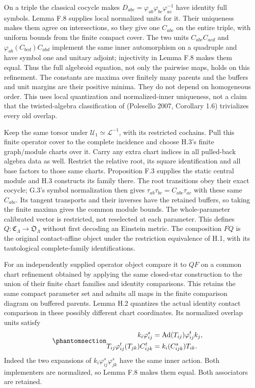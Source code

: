 \documentclass[
  english,
  11pt,
  reqno]{amsart}
\begin{document}
On a triple the classical cocycle makes
\(D_{abc}=\varphi_{ab}\varphi_{bc}\varphi_{ac}^{-1}\) have identity full
symbols. Lemma F.8 supplies local normalized units for it. Their
uniqueness makes them agree on intersections, so they give one
\(C_{abc}\) on the entire triple, with uniform bounds from the finite
compact cover. The two units \(C_{abc}C_{acd}\) and
\(\varphi_{ab}(C_{bcd})C_{abd}\) implement the same inner automorphism
on a quadruple and have symbol one and unitary adjoint; injectivity in
Lemma F.8 makes them equal. Thus the full algebroid equation, not only
the pairwise maps, holds on this refinement. The constants are maxima
over finitely many parents and the buffers and unit margins are their
positive minima. They do not depend on homogeneous order. This uses
local quantization and normalized-inner uniqueness, not a claim that the
twisted-algebra classification of (Polesello 2007, Corollary 1.6)
trivializes every old overlap.

Keep the same torsor under \(\mathscr U_1\simeq\mathcal L^{-1}\), with
its restricted cochains. Pull this finite operator cover to the complete
incidence and choose H.3's finite graph/module charts over it. Carry any
extra chart indices in all pulled-back algebra data as well. Restrict
the relative root, its square identification and all base factors to
those same charts. Proposition F.3 supplies the static central module
and H.3 constructs its family there. The root transitions obey their
exact cocycle; G.3's symbol normalization then gives
\(\tau_{ab}\tau_{bc}=C_{abc}\tau_{ac}\) with these same \(C_{abc}\). Its
tangent transports and their inverses have the retained buffers, so
taking the finite maxima gives the common module bounds. The
whole-parameter calibrated vector is restricted, not reselected at each
parameter. This defines \(Q:\mathfrak C_\Lambda\to\mathfrak O_\Lambda\)
without first decoding an Einstein metric. The composition \(FQ\) is the
original contact-affine object under the restriction equivalence of H.1,
with its tautological complete-family identifications.

For an independently supplied operator object compare it to \(QF\) on a
common chart refinement obtained by applying the same closed-star
construction to the union of their finite chart families and identity
comparisons. This retains the same compact parameter set and admits all
maps in the finite comparison diagram on buffered parents. Lemma H.2
quantizes the actual identity contact comparison in these possibly
different chart coordinates. Its normalized overlap units satisfy
\begin{equation}\protect\phantomsection\label{eq:gg-independent-op-two-inverse-descent}{
 \begin{aligned}
 k_i\varphi^{s}_{ij}
   &=\operatorname{Ad}(T_{ij})\varphi^{t}_{ij}k_j,\\
 T_{ij}\varphi^{t}_{ij}(T_{jk})C^{t}_{ijk}
   &=k_i(C^{s}_{ijk})T_{ik}.
 \end{aligned}
}\end{equation} Indeed the two expansions of
\(k_i\varphi^s_{ij}\varphi^s_{jk}\) have the same inner action. Both
implementers are normalized, so Lemma F.8 makes them equal. Both
associators are retained.
\end{document}

